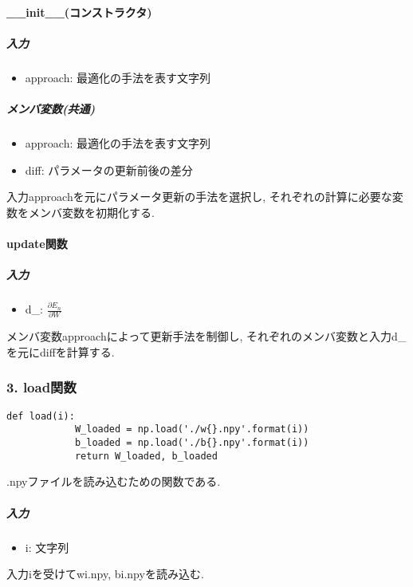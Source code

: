 \documentclass[a4j, titlepage]{jarticle}
\begin{document}
        \paragraph*{\_\_init\_\_(コンストラクタ)}
            \subparagraph*{入力}
            \begin{itemize}
                \item approach: 最適化の手法を表す文字列
            \end{itemize}
            \subparagraph*{メンバ変数(共通)}
            \begin{itemize}
                \item approach: 最適化の手法を表す文字列
                \item diff: パラメータの更新前後の差分
            \end{itemize}
            入力approachを元にパラメータ更新の手法を選択し, それぞれの計算に必要な変数をメンバ変数を初期化する.
        \paragraph*{update関数}
            \subparagraph*{入力}
            \begin{itemize}
                \item d\_: \(\displaystyle \frac{\partial E_n}{\partial W}\)
            \end{itemize}
            メンバ変数approachによって更新手法を制御し, それぞれのメンバ変数と入力d\_を元にdiffを計算する.


    \subsubsection*{3. load関数}
        \begin{lstlisting}[caption=Wとbの.npyファイルを読み込み,label=fuga]
        def load(i):
            W_loaded = np.load('./w{}.npy'.format(i))
            b_loaded = np.load('./b{}.npy'.format(i))
            return W_loaded, b_loaded
        \end{lstlisting}
        .npyファイルを読み込むための関数である.
            \subparagraph*{入力}
            \begin{itemize}
                \item i: 文字列
            \end{itemize}
            入力iを受けてwi.npy, bi.npyを読み込む.
\end{document}
